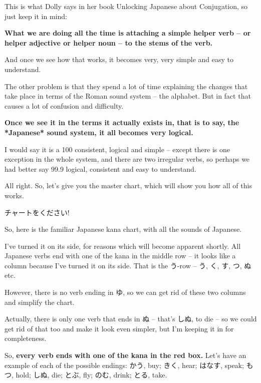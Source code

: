 \startsectionlevel[title={Intro to Conjugation},reference={intro-to-conjugation}]

This is what Dolly says in her book Unlocking Japanese about Conjugation, so just keep it in mind:

{}

{\bf What we are doing all the time is attaching a simple helper verb -- or helper adjective or helper noun -- to the stems of the verb.}

And once we see how that works, it becomes very, very simple and easy to understand.

The other problem is that they spend a lot of time explaining the changes that take place in terms of the Roman sound system -- the alphabet. But in fact that causes a lot of confusion and difficulty.

{\bf Once we see it in the terms it actually exists in, that is to say, the *Japanese* sound system, it all becomes very logical.}

I would say it is a 100 consistent, logical and simple -- except there is one exception in the whole system, and there are two irregular verbs, so perhaps we had better say 99.9 logical, consistent and easy to understand.

All right. So, let's give you the master chart, which will show you how all of this works.

チャートをください!

So, here is the familiar Japanese kana chart, with all the sounds of Japanese.

{}

I've turned it on its side, for reasons which will become apparent shortly. All Japanese verbs end with one of the kana in the middle row -- it looks like a column because I've turned it on its side. That is the う-row -- う, く, す, つ, ぬ etc.

However, there is no verb ending in ゆ, so we can get rid of these two columns and simplify the chart.

{}

Actually, there is only one verb that ends in ぬ -- that's しぬ, to die -- so we could get rid of that too and make it look even simpler, but I'm keeping it in for completeness.

So, {\bf every verb ends with one of the kana in the red box.} Let's have an example of each of the possible endings:\crlf
かう, buy; きく, hear; はなす, speak; もつ, hold; しぬ, die; とぶ, fly; のむ, drink; とる, take.

